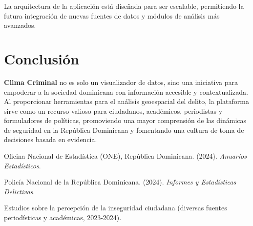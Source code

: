 \documentclass[12pt, a4paper]{article}
\begin{document}
La arquitectura de la aplicación está diseñada para ser escalable, permitiendo la futura integración de nuevas fuentes de datos y módulos de análisis más avanzados.

\section{Conclusión}

\textbf{Clima Criminal} no es solo un visualizador de datos, sino una iniciativa para empoderar a la sociedad dominicana con información accesible y contextualizada. Al proporcionar herramientas para el análisis geoespacial del delito, la plataforma sirve como un recurso valioso para ciudadanos, académicos, periodistas y formuladores de políticas, promoviendo una mayor comprensión de las dinámicas de seguridad en la República Dominicana y fomentando una cultura de toma de decisiones basada en evidencia.

\begin{thebibliography}{9}
    Oficina Nacional de Estadística (ONE), República Dominicana. (2024). \textit{Anuarios Estadísticos}.
    
    Policía Nacional de la República Dominicana. (2024). \textit{Informes y Estadísticas Delictivas}.
    
    Estudios sobre la percepción de la inseguridad ciudadana (diversas fuentes periodísticas y académicas, 2023-2024).

\end{thebibliography}
\end{document}
